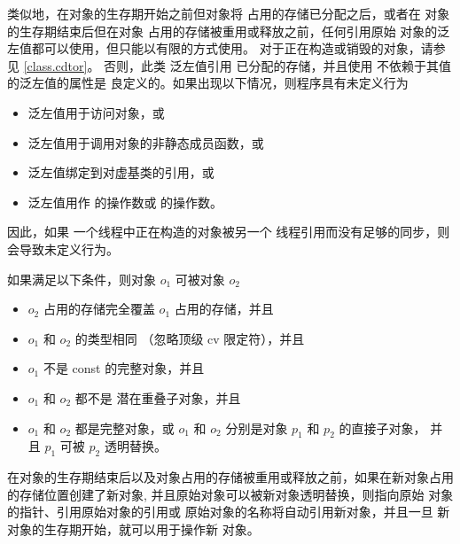 \pnum
类似地，在对象的生存期开始之前但对象将
占用的存储已分配之后，或者在
对象的生存期结束后但在对象
占用的存储被重用或释放之前，任何引用原始
对象的泛左值都可以使用，但只能以有限的方式使用。
对于正在构造或销毁的对象，请参见 \ref{class.cdtor}。
否则，此类
泛左值引用
已分配的存储，并且使用
不依赖于其值的泛左值的属性是
良定义的。如果出现以下情况，则程序具有未定义行为
\begin{itemize}
\item 泛左值用于访问对象，或
\item 泛左值用于调用对象的非静态成员函数，或
\item 泛左值绑定到对虚基类的引用，或
\item 泛左值用作
 的操作数或  的操作数。
\end{itemize}

\begin{note}
因此，如果
一个线程中正在构造的对象被另一个
线程引用而没有足够的同步，则会导致未定义行为。
\end{note}

\pnum
如果满足以下条件，则对象 $o_1$ 可被对象 $o_2$ 
\begin{itemize}
\item $o_2$ 占用的存储完全覆盖
$o_1$ 占用的存储，并且

\item $o_1$ 和 $o_2$ 的类型相同
（忽略顶级 cv 限定符），并且

\item $o_1$ 不是 const 的完整对象，并且

\item $o_1$ 和 $o_2$ 都不是
潜在重叠子对象，并且

\item $o_1$ 和 $o_2$ 都是完整对象，或
$o_1$ 和 $o_2$ 分别是对象 $p_1$ 和 $p_2$ 的直接子对象，
并且 $p_1$ 可被 $p_2$ 透明替换。
\end{itemize}

\pnum
在对象的生存期结束后以及对象占用的存储被重用或释放之前，如果在新对象占用的存储位置创建了新对象,
并且原始对象可以被新对象透明替换，则指向原始
对象的指针、引用原始对象的引用或
原始对象的名称将自动引用新对象，并且一旦
新对象的生存期开始，就可以用于操作新
对象。

